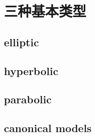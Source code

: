 \section{三种基本类型}
\label{b2:sec:0802}


\subsection{elliptic}
\label{b2:subsec:080201}

\subsection{hyperbolic}
\label{b2:subsec:080202}

\subsection{parabolic}
\label{b2:subsec:080203}

\subsection{canonical models}
\label{b2:subsec:080204}


